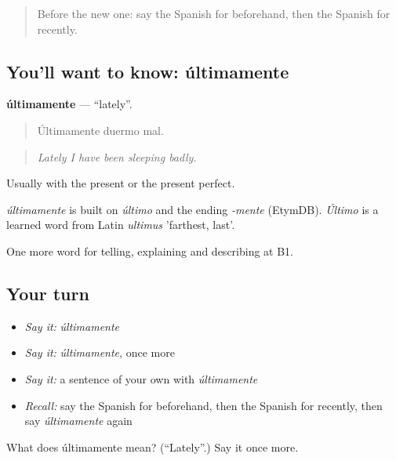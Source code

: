 \label{lesson:ES-C538-ultimamente}



\begin{quote}
Before the new one: say the Spanish for beforehand, then the Spanish for recently.
\end{quote}

\subsection*{You'll want to know: últimamente}
\textbf{últimamente} — \textquotedblleft{}lately\textquotedblright{}.

\begin{quote}
Últimamente duermo mal.
\end{quote}

\begin{quote}
\emph{Lately I have been sleeping badly.}
\end{quote}

Usually with the present or the present perfect.

\begin{cousinweb}
\emph{últimamente} is built on \emph{último} and the ending \emph{-mente} (EtymDB). \emph{Último} is a learned word from Latin \emph{ultimus} 'farthest, last'.
\end{cousinweb}

\begin{grammarlens}[title={What you've built}]
One more word for telling, explaining and describing at B1.
\end{grammarlens}

\subsection*{Your turn}
\begin{itemize}
\raggedright
  \item \emph{Say it:} \emph{últimamente}
  \item \emph{Say it:} \emph{últimamente}, once more
  \item \emph{Say it:} a sentence of your own with \emph{últimamente}
  \item \emph{Recall:} say the Spanish for beforehand, then the Spanish for recently, then say \emph{últimamente} again
\end{itemize}

\begin{tcolorbox}[breakable,colback=teal!4,colframe=teal!35!black,title={Before you move on}]
What does últimamente mean? (\textquotedblleft{}Lately\textquotedblright{}.) Say it once more.
\end{tcolorbox}
